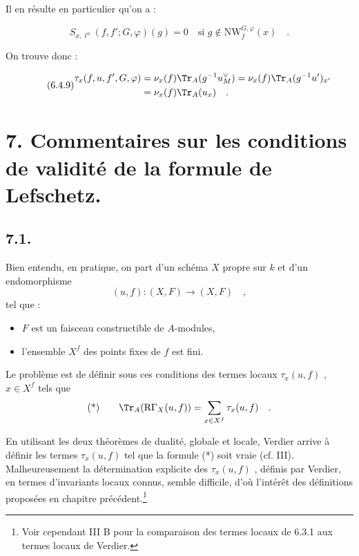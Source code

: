Il en résulte en particulier qu'on a :

\begin{equation}\tag{6.4.8}
S_{x,\ell^n}(f, f'; G, \varphi)(g) = 0 \quad \text{si } g \notin \mathrm{NW}_{f}^{G,\varphi}(x) \quad .
\end{equation}

On trouve donc :

\begin{equation}\tag{6.4.9}
\begin{aligned}
\tau_x(f,u, f', G, \varphi) &= \nu_x(f) \Tr_A(g^{-1}u_M^\vee) = \nu_x(f) \Tr_A(g^{-1}u')_{x'} \\
&= \nu_x(f) \Tr_A(u_x) \quad .
\end{aligned}
\end{equation}

\section*{7. Commentaires sur les conditions de validité de la formule de Lefschetz.}

\subsection*{7.1.}
Bien entendu, en pratique, on part d'un schéma $X$ propre sur $k$ et d'un endomorphisme
\[
(u, f) : (X, F) \longrightarrow (X, F) \quad ,
\]
tel que :
\begin{itemize}[label=-]
\item $F$ est un faisceau constructible de $A$-modules,
\item l'ensemble $X^f$ des points fixes de $f$ est fini.
\end{itemize}

Le problème est de définir sous ces conditions des termes locaux $\tau_x(u, f)$ , $x \in X^f$ tels que
\[
\text{(*)} \qquad \Tr_A(\mathrm{R}\Gamma_X(u, f)) = \sum_{x \in X^f} \tau_x(u, f) \quad .
\]

En utilisant les deux théorèmes de dualité, globale et locale, Verdier arrive à définir les termes $\tau_x(u, f)$ tel que la formule (*) soit vraie (cf. III). Malheureusement la détermination explicite des $\tau_x(u, f)$ , définis par Verdier, en termes d'invariants locaux connus, semble difficile, d'où l'intérêt des définitions proposées en chapitre précédent.\footnote{Voir cependant III B pour la comparaison des termes locaux de 6.3.1 aux termes locaux de Verdier.}


